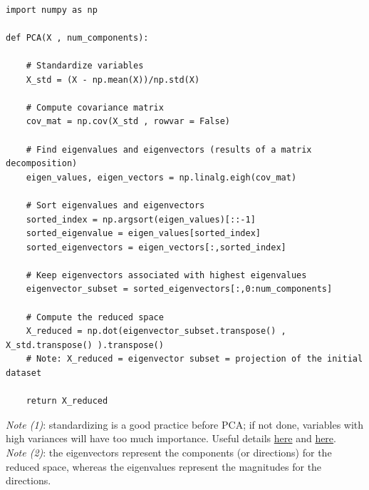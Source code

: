 \lstset{language=Python}
\lstset{frame=lines}
\lstset{basicstyle=\footnotesize}
\begin{lstlisting}

import numpy as np

def PCA(X , num_components):
 
    # Standardize variables
    X_std = (X - np.mean(X))/np.std(X)
 
    # Compute covariance matrix
    cov_mat = np.cov(X_std , rowvar = False)
 
    # Find eigenvalues and eigenvectors (results of a matrix decomposition)
    eigen_values, eigen_vectors = np.linalg.eigh(cov_mat)
    
    # Sort eigenvalues and eigenvectors
    sorted_index = np.argsort(eigen_values)[::-1]
    sorted_eigenvalue = eigen_values[sorted_index]
    sorted_eigenvectors = eigen_vectors[:,sorted_index]
    
    # Keep eigenvectors associated with highest eigenvalues
    eigenvector_subset = sorted_eigenvectors[:,0:num_components]
    
    # Compute the reduced space
    X_reduced = np.dot(eigenvector_subset.transpose() , X_std.transpose() ).transpose()
    # Note: X_reduced = eigenvector subset = projection of the initial dataset
    
    return X_reduced

\end{lstlisting}

\textit{Note (1)}: standardizing is a good practice before PCA; if not done, variables with high variances will have too much importance. Useful details \href{https://stats.stackexchange.com/questions/53/pca-on-correlation-or-covariance}{here} and \href{https://stats.stackexchange.com/questions/69157/why-do-we-need-to-normalize-data-before-principal-component-analysis-pca?noredirect=1&lq=1}{here}.\\

\textit{Note (2)}: the eigenvectors represent the components (or directions) for the reduced space, whereas the eigenvalues represent the magnitudes for the directions.

\vspace{5mm}